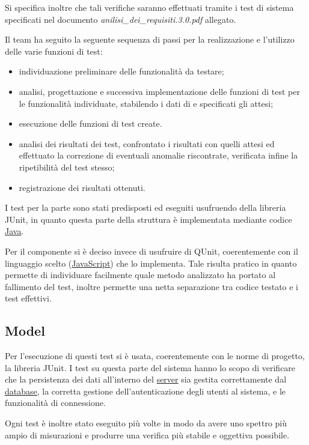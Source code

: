 Si specifica inoltre che tali verifiche saranno effettuati tramite i test di sistema specificati nel documento \textit{anilisi\_dei\_requisiti.3.0.pdf} allegato.

Il team ha seguito la seguente sequenza di passi per la realizzazione e l'utilizzo delle varie funzioni di test:
\begin{itemize}[noitemsep,nolistsep]
\item individuazione preliminare delle funzionalità da testare;
\item analisi, progettazione e successiva implementazione delle funzioni di test per le funzionalità individuate, stabilendo i dati di  e specificati gli  attesi;
\item esecuzione delle funzioni di test create.
\item analisi dei risultati dei test, confrontato i risultati con quelli attesi ed effettuato la correzione di eventuali anomalie riscontrate, verificata infine la ripetibilità del test stesso;
\item registrazione dei risultati ottenuti.
\end{itemize}

I test per la parte  sono stati predisposti ed eseguiti usufruendo della libreria JUnit, in quanto questa parte della struttura è implementata mediante codice \underline{Java}.

Per il componente  si è deciso invece di usufruire di QUnit, coerentemente con il linguaggio scelto (\underline{JavaScript}) che lo implementa. Tale \underline{} risulta pratico in quanto permette di individuare facilmente quale metodo analizzato ha portato al fallimento del test, inoltre permette una netta separazione tra codice testato e i test effettivi.

\subsection{Model}
Per l'esecuzione di questi test si è usata, coerentemente con le norme di progetto, la libreria JUnit. I test su questa parte del sistema hanno lo scopo di verificare che la persistenza dei dati all'interno del \underline{server} sia gestita correttamente dal \underline{database}, la corretta gestione dell'autenticazione degli utenti al sistema, e le funzionalità di connessione.

Ogni test è inoltre stato eseguito più volte in modo da avere uno spettro più ampio di misurazioni e produrre una verifica più stabile e oggettiva possibile.


